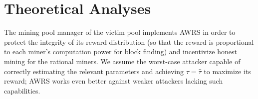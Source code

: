 \section{Theoretical Analyses}
\label{sec:theoretical_analyses}
The mining pool manager of the victim pool implements AWRS in order to protect the integrity of its reward distribution (so that the reward is proportional to each miner's computation power for block finding) and incentivize honest mining for the rational miners. %
We assume the worst-case attacker capable of correctly estimating the relevant parameters and achieving $\tau=\hat{\tau}$ to maximize its reward;
AWRS works even better against weaker attackers lacking such capabilities.



